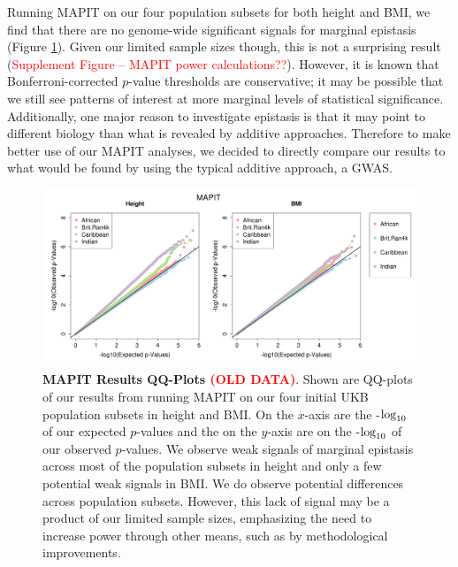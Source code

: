 \documentclass[12pt, a4paper]{article}
\def\log{{\rm log}}
\newcommand{\red}[1]{\textcolor{red}{#1}}
\begin{document}
Running MAPIT on our four population subsets for both height and BMI, we find that there are no genome-wide significant signals for marginal epistasis (Figure \ref{InterPath-Main-Figure-MAPIT}). Given our limited sample sizes though, this is not a surprising result (\textcolor{red}{Supplement Figure -- MAPIT power calculations??}). However, it is known that Bonferroni-corrected $p$-value thresholds are conservative; it may be possible that we still see patterns of interest at more marginal levels of statistical significance. Additionally, one major reason to investigate epistasis is that it may point to different biology than what is revealed by additive approaches. Therefore to make better use of our MAPIT analyses, we decided to directly compare our results to what would be found by using the typical additive approach, a GWAS. 

\begin{figure}[htbp]
\centering
\includegraphics[scale=.35]{Images/InterPath_Main_Figure_MAPIT_vs1.png}
\caption[TBD]{\textbf{MAPIT Results QQ-Plots \red{(OLD DATA)}}. Shown are QQ-plots of our results from running MAPIT on our four initial UKB population subsets in height and BMI. On the $x$-axis are the -$\log_{10}$ of our expected $p$-values and the on the $y$-axis are on the -$\log_{10}$ of our observed $p$-values. We observe weak signals of marginal epistasis across most of the population subsets in height and only a few potential weak signals in BMI. We do observe potential differences across population subsets. However, this lack of signal may be a product of our limited sample sizes, emphasizing the need to increase power through other means, such as by methodological improvements.}
\label{InterPath-Main-Figure-MAPIT}
\end{figure}
\end{document}
